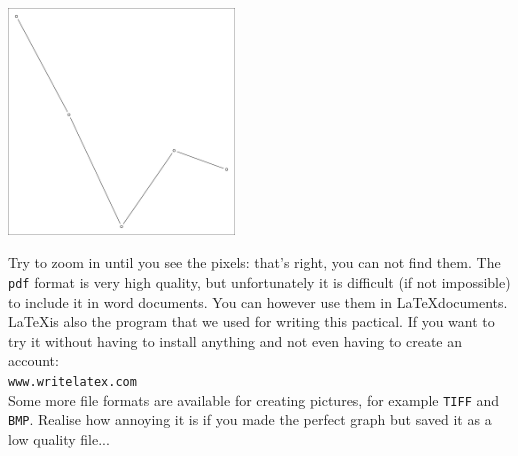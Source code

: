 \documentclass{article}\usepackage[]{graphicx}\usepackage[]{color}
\begin{document}
\begin{mdframed}
\begin{center}
\includegraphics[width=0.45\textwidth]{pdf1.pdf}
\end{center}
Try to zoom in until you see the pixels: that's right, you can not find them. The \texttt{pdf} format is very high quality, but unfortunately it is difficult (if not impossible) to include it in word documents. You can however use them in \LaTeX documents. \LaTeX is also the program that we used for writing this pactical. If you want to try it without having to install anything and not even having to create an account:\\
\texttt{www.writelatex.com} \\
Some more file formats are available for creating pictures, for example \texttt{TIFF} and \texttt{BMP}. Realise how annoying it is if you made the perfect graph but saved it as a low quality file...
\end{mdframed}
\end{document}
